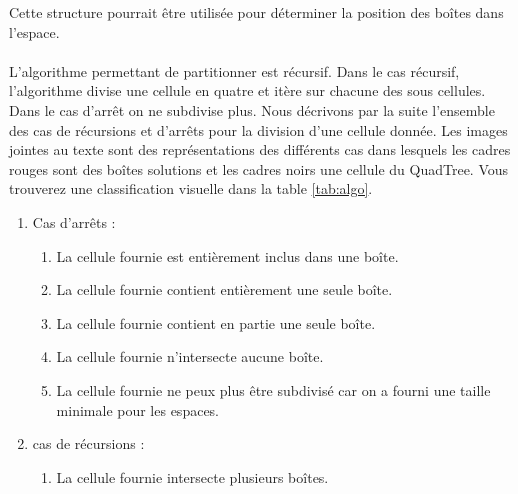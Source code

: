 Cette structure pourrait être utilisée pour déterminer la position des boîtes dans l'espace.

\paragraph{}L'algorithme permettant de partitionner est récursif. Dans le cas récursif, l'algorithme divise une cellule en quatre et itère sur chacune des sous cellules. Dans le cas d'arrêt on ne subdivise plus. Nous décrivons par la suite l'ensemble des cas de récursions et d'arrêts pour la division d'une cellule donnée. Les images jointes au texte sont des représentations des différents cas dans lesquels les cadres rouges sont des boîtes solutions et les cadres noirs une cellule du QuadTree. Vous trouverez une classification visuelle dans la table \ref{tab:algo}.
\begin{enumerate}
\item Cas d'arrêts : 
\begin{enumerate}
\item La cellule fournie est entièrement inclus dans une boîte.
\label{enu:quad1}
\item La cellule fournie contient entièrement une seule boîte.
\label{enu:quad2}
\item La cellule fournie contient en partie une seule boîte.
\label{enu:quad3}
\item La cellule fournie n'intersecte aucune boîte.
\label{enu:quad4}
\item La cellule fournie ne peux plus être subdivisé car on a fourni une taille minimale pour les espaces.
\end{enumerate}
\item cas de récursions :
\begin{enumerate}
\item La cellule fournie intersecte plusieurs boîtes.
\label{enu:quad5}
\end{enumerate}
\end{enumerate}

